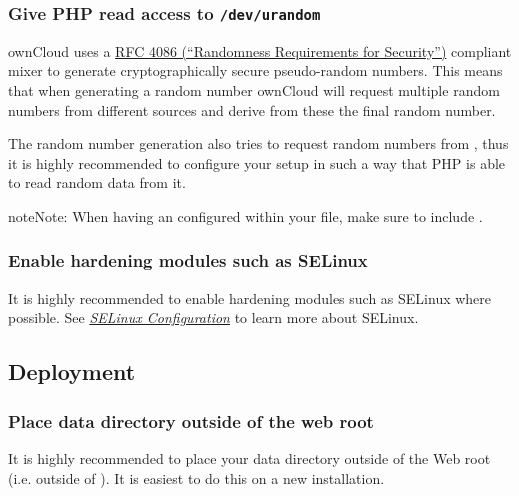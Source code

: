 \documentclass[letterpaper,10pt,english]{sphinxmanual}
\begin{document}
\subsubsection{Give PHP read access to \texttt{/dev/urandom}}
\label{configuration_server/harden_server:dev-urandom-label}\label{configuration_server/harden_server:give-php-read-access-to-dev-urandom}
ownCloud uses a \href{https://tools.ietf.org/html/rfc4086\#section-5.2}{RFC 4086 (``Randomness Requirements for Security'')} compliant
mixer to generate cryptographically secure pseudo-random numbers. This means
that when generating a random number ownCloud will request multiple random
numbers from different sources and derive from these the final random number.

The random number generation also tries to request random numbers from
, thus it is highly recommended to configure your setup in such
a way that PHP is able to read random data from it.

\begin{notice}{note}{Note:}
When having an  configured within your  file,
make sure to include .
\end{notice}


\subsubsection{Enable hardening modules such as SELinux}
\label{configuration_server/harden_server:enable-hardening-modules-such-as-selinux}
It is highly recommended to enable hardening modules such as SELinux where
possible. See {\hyperref[installation/selinux_configuration::doc]{\emph{SELinux Configuration}}} to learn more about
SELinux.


\subsection{Deployment}
\label{configuration_server/harden_server:deployment}

\subsubsection{Place data directory outside of the web root}
\label{configuration_server/harden_server:place-data-directory-outside-of-the-web-root}
It is highly recommended to place your data directory outside of the Web root
(i.e. outside of ). It is easiest to do this on a new
installation.
\end{document}

